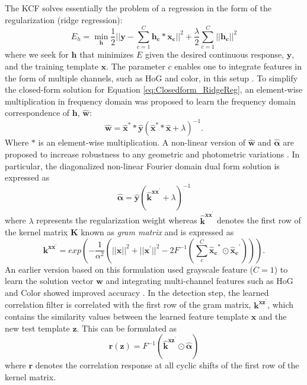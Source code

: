 \documentclass[10pt,twocolumn,letterpaper]{article}
\begin{document}
The KCF solves essentially the problem of a regression in the form of
the regularization (ridge regression):
\begin{equation}
E_h = \min_{\boldsymbol{h}}\frac{1}{2}||\boldsymbol{y}-\sum_{c=1}^{C}\boldsymbol{h_{c}}*\boldsymbol{x_{c}}||^{2} + \frac{\lambda}{2}\sum_{c=1}^{C}||\boldsymbol{h_{c}}||^{2}
\label{eq:Closedform_RidgeReg}
\end{equation}
where we seek for $\boldsymbol{h}$ that minimizes $E$ given the
desired continuous response, $\boldsymbol{y}$, and the training
template $\boldsymbol{x}$.  The parameter $c$ enables one to integrate
features in the form of multiple channels, such as HoG and color, in
this setup \cite{galoogahi2013multi,henriques2015high}. To simplify
the closed-form solution for Equation \ref{eq:Closedform_RidgeReg}, an
element-wise multiplication in frequency domain was proposed to learn
the frequency domain correspondence of $\boldsymbol{h}$,
$\boldsymbol{\hat{w}}$:
\begin{equation}
\boldsymbol{\hat{w}} = \boldsymbol{\hat{x}^{*}}*\boldsymbol{\hat{y}}(\boldsymbol{\hat{x}^{*}}*\boldsymbol{\hat{x}}+\lambda)^{-1}.
\label{eq:DiagonalizedPrimalSolution}
\end{equation}
Where $*$ is an element-wise multiplication. A non-linear version of
$\boldsymbol{\hat{w}}$ and $\boldsymbol{\hat{\alpha}}$ are proposed to
increase robustness to any geometric and photometric variations
\cite{henriques2015high}. In particular, the diagonalized non-linear
Fourier domain dual form solution is expressed as
\begin{equation}
\boldsymbol{\hat{\alpha}} = \boldsymbol{\hat{y}}(\boldsymbol{\hat{k}^{xx^{'}}}+\lambda)^{-1}
\label{eq:FourierDualDomainSolution}
\end{equation}
where $\lambda$ represents the regularization weight whereas $\boldsymbol{\hat{k}^{xx^{'}}}$ denotes
 the first row of the kernel matrix $\boldsymbol{K}$ known as \textit{gram matrix} and is expressed as
\begin{equation}
\boldsymbol{k^{xx^{'}}} = exp(-\dfrac{1}{\alpha^{2}}(||\boldsymbol{x}||^{2}+||\boldsymbol{x}^{'}||^{2}-2F^{-1}(\sum^{C}_{c}\boldsymbol{\hat{x}_{c}}^{*}\odot \boldsymbol{\hat{x}_{c}}^{'}))).
\label{eq:GaussianCorrelationSingleChannel}
\end{equation}
An earlier version based on this formulation used grayscale feature
($C=1$) to learn the solution vector $\boldsymbol{w}$ and integrating
multi-channel features such as HoG and Color showed improved accuracy
\cite{bibi2015multi,galoogahi2013multi,henriques2015high,ma2015long,tang2015multi}.
In the detection step, the learned correlation filter is correlated
with the first row of the gram matrix, $\boldsymbol{k^{xz^{'}}}$,
which contains the similarity values between the learned feature
template $\boldsymbol{x}$ and the new test template
$\boldsymbol{z}$. This can be formulated as
\begin{equation}
\boldsymbol{r(z)} = F^{-1}(\boldsymbol{\hat{k}^{xz^{'}}} \odot \boldsymbol{\hat{\alpha}})
\end{equation}
where $\boldsymbol{r}$ denotes the correlation response at all cyclic shifts of the
first row of the kernel matrix.
\end{document}
